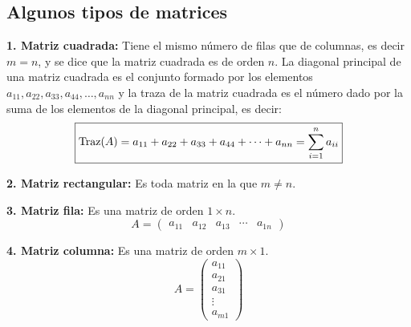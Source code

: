 \documentclass[11pt,a4paper]{article}
\newcommand{\hl}[1]{\textcolor{resaltado}{#1}}
\begin{document}
\subsection*{Algunos tipos de matrices}

\textbf{1. Matriz cuadrada:} Tiene el mismo número de filas que de columnas, es decir
\hl{$m = n$}, y se dice que la matriz cuadrada es de \hl{orden $n$}. La diagonal principal
de una matriz cuadrada es el conjunto formado por los elementos
$a_{11}, a_{22}, a_{33}, a_{44}, \ldots, a_{nn}$ y la traza de la matriz cuadrada es el
número dado por la suma de los elementos de la diagonal principal, es decir:
\[\fbox{$\operatorname{Traz}(A) = a_{11} + a_{22} + a_{33} + a_{44} + \cdots + a_{nn} = \displaystyle\sum_{i=1}^{n} a_{ii}$}\]

\textbf{2. Matriz rectangular:} Es toda matriz en la que $m \neq n$.

\begin{minipage}[t]{0.485\textwidth}
\textbf{3. Matriz fila:} Es una matriz de orden $1\times n$.
\[A = \begin{pmatrix} a_{11} & a_{12} & a_{13} & \cdots & a_{1n}\end{pmatrix}\]
\end{minipage}\hfill
\begin{minipage}[t]{0.485\textwidth}
\textbf{4. Matriz columna:} Es una matriz de orden $m\times 1$.
\[A = \begin{pmatrix} a_{11}\\ a_{21}\\ a_{31}\\ \vdots\\ a_{m1}\end{pmatrix}\]
\end{minipage}
\end{document}
